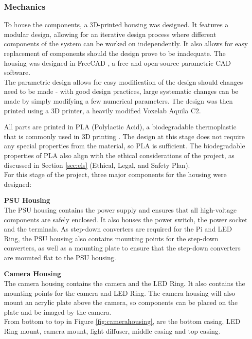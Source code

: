 \subsubsection{Mechanics} \label{sec:mechanics}
To house the components, a 3D-printed housing was designed. It features a modular design, allowing for an iterative design process
where different components of the system can be worked on independently. It also allows for easy replacement of components
should the design prove to be inadequate. The housing was designed in FreeCAD \cite{freecad}, a free and open-source parametric CAD software. \\
The parametric design allows for easy modification of the design should changes need to be made -
with good design practices, large systematic changes can be made by simply modifying a few numerical parameters.
The design was then printed using a 3D printer, a heavily modified Voxelab Aquila C2. 

All parts are printed in PLA (Polylactic Acid), a biodegradable thermoplastic that is commonly used in 3D printing \cite{Ranakoti2022}. The design
at this stage does not require any special properties from the material, so PLA is sufficient. The biodegradable properties of PLA
also align with the ethical considerations of the project, as discussed in Section \ref{sec:els} (Ethical, Legal, and Safety Plan). \\

For this stage of the project, three major components for the housing were designed:

\noindent
\textbf{PSU Housing} \\
The PSU housing contains the power supply and ensures that all high-voltage components are safely enclosed.
It also houses the power switch, the power socket and the terminals. As step-down converters are required for the Pi and LED Ring,
the PSU housing also contains mounting points for the step-down converters, as well as a mounting plate to ensure that the step-down converters
are mounted flat to the PSU housing.

\noindent
\textbf{Camera Housing}
\label{sec:camerahousing} \\
The camera housing contains the camera and the LED Ring. It also contains the mounting points for the camera and LED Ring.
The camera housing will also mount an acrylic plate above the camera, so components can be placed on the plate and be imaged by the camera. \\
From bottom to top in Figure \ref{fig:camerahousing}, are the bottom casing, LED Ring mount, camera mount, light diffuser, middle casing and
top casing. \\

